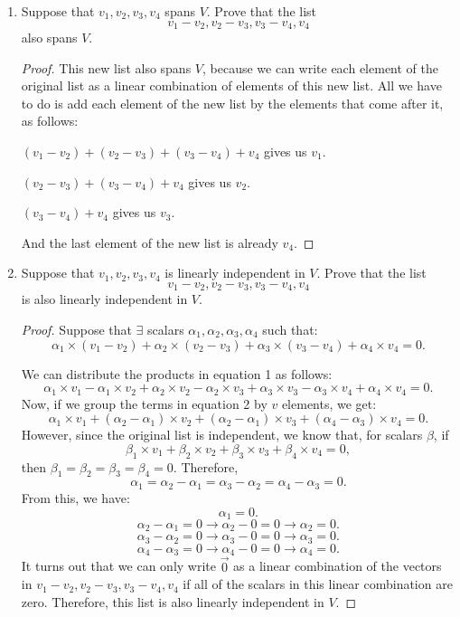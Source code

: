 \documentclass{article}
\begin{document}
\begin{enumerate}
\item
Suppose that $v_1, v_2, v_3, v_4$ spans $V$. Prove that the list
\[ v_1 - v_2, v_2 - v_3, v_3 - v_4, v_4 \]
also spans $V$.
\begin{proof}
This new list also spans $V$, because we can write each element of the original list as a linear combination of elements of this new list. All we have to do is add each element of the new list by the elements that come after it, as follows:
\par $(v_1 - v_2) + (v_2 - v_3) + (v_3 - v_4) + v_4 $ gives us $v_1$.
\par  $(v_2 - v_3) + (v_3 - v_4) + v_4$ gives us $v_2$.
\par $(v_3 - v_4) + v_4$ gives us $v_3$.
\par And the last element of the new list is already $v_4$.
\end{proof}



\item
Suppose that $v_1, v_2, v_3, v_4$ is linearly independent in $V$. Prove that the list
\[ v_1 - v_2, v_2 - v_3, v_3 - v_4, v_4 \]
is also linearly independent in $V$.
\begin{proof}
Suppose that $\exists$ scalars $\alpha_1, \alpha_2, \alpha_3, \alpha_4$ such that:
\begin{equation} \alpha_1 \times (v_1 - v_2) + \alpha_2 \times (v_2 - v_3) + \alpha_3 \times (v_3 - v_4) + \alpha_4 \times v_4 = 0. \label{eq:1} \end{equation}
\par We can distribute the products in equation 1 as follows:
\begin{equation}\alpha_1 \times v_1 - \alpha_1 \times v_2 + \alpha_2 \times v_2 - \alpha_2 \times v_3 + \alpha_3 \times v_3 - \alpha_3 \times v_4 + \alpha_4 \times v_4 = 0. \end{equation}
Now, if we group the terms in equation 2 by $v$ elements, we get:
\begin{equation}\alpha_1 \times v_1 + (\alpha_ 2 - \alpha_1)  \times v_2 + (\alpha_ 2 - \alpha_1) \times v_3 + (\alpha_4 - \alpha_3) \times v_4 = 0. \end{equation}
However, since the original list is independent, we know that, for scalars $\beta$, if
$$\beta_1 \times v_1 + \beta_2  \times v_2 + \beta_3 \times v_3 + \beta_4\times v_4 = 0, $$
then $\beta_1 = \beta_2  = \beta_3 = \beta_4 = 0$. 
Therefore, $$\alpha_1 = \alpha_ 2 - \alpha_1 = \alpha_ 3 - \alpha_2 = \alpha_4 - \alpha_3 = 0.$$
From this, we have:
$$\alpha_1 = 0.$$
$$\alpha_ 2 - \alpha_1 = 0 \rightarrow \alpha_2 - 0 = 0 \rightarrow \alpha_2 = 0.$$
$$\alpha_ 3 - \alpha_2 = 0 \rightarrow \alpha_3 - 0 = 0 \rightarrow \alpha_3 = 0.$$
$$\alpha_ 4 - \alpha_3 = 0 \rightarrow \alpha_4 - 0 = 0 \rightarrow \alpha_4 = 0.$$
It turns out that we can only write $\vec{0}$ as a linear combination of the vectors in $v_1 - v_2, v_2 - v_3, v_3 - v_4, v_4$ if all of the scalars in this linear combination are zero. Therefore, this list is also linearly independent in $V$.

\end{proof}

\end{enumerate}
\end{document}
